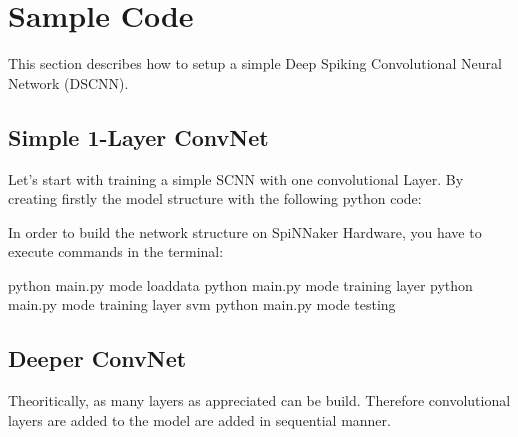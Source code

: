 \documentclass[letterpaper,10pt,english]{sphinxmanual}
\begin{document}
\chapter{Sample Code}
\label{\detokenize{samplecode::doc}}\label{\detokenize{samplecode:sample-code}}
This section describes how to setup a simple Deep Spiking Convolutional Neural Network (DSCNN).


\section{Simple 1-Layer ConvNet}
\label{\detokenize{samplecode:simple-1-layer-convnet}}
Let’s start with training a simple SCNN with one convolutional Layer. By creating firstly the model structure with the following python code:

\begin{sphinxVerbatim}[commandchars=\\\{\}]
   
 
\end{sphinxVerbatim}

In order to build the network structure on SpiNNaker Hardware, you have to execute commands in the terminal:

\begin{sphinxVerbatim}[commandchars=\\\{\}]
python main.py \PYGZhy{}\PYGZhy{}mode loaddata
python main.py \PYGZhy{}\PYGZhy{}mode training \PYGZhy{}\PYGZhy{}layer 
python main.py \PYGZhy{}\PYGZhy{}mode training \PYGZhy{}\PYGZhy{}layer svm
python main.py \PYGZhy{}\PYGZhy{}mode testing
\end{sphinxVerbatim}


\section{Deeper ConvNet}
\label{\detokenize{samplecode:deeper-convnet}}
Theoritically, as many layers as appreciated can be build. Therefore convolutional layers are added to the model are added in sequential manner.
\end{document}
